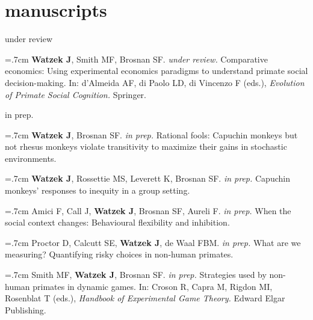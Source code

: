 \documentclass[]{friggeri-cv}
\begin{document}
\section{manuscripts}

{\large{} under review}

\hangindent=.7cm \textbf{Watzek J}, Smith MF, Brosnan SF. \emph{under review.} Comparative economics: Using experimental economics paradigms to understand primate social decision-making. In: d'Almeida AF, di Paolo LD, di Vincenzo F (eds.), \emph{Evolution of Primate Social Cognition.} Springer.


\newpage
\thispagestyle{fancy}

{\large{} in prep.}

\hangindent=.7cm \textbf{Watzek J}, Brosnan SF. \emph{in prep.} Rational fools: Capuchin monkeys but not rhesus monkeys violate transitivity to maximize their gains in stochastic environments.

\hangindent=.7cm \textbf{Watzek J}, Rossettie MS, Leverett K, Brosnan SF. \emph{in prep.} Capuchin monkeys' responses to inequity in a group setting.

\hangindent=.7cm Amici F, Call J, \textbf{Watzek J}, Brosnan SF, Aureli F. \emph{in prep.} When the social context changes: Behavioural flexibility and inhibition.



\hangindent=.7cm Proctor D, Calcutt SE, \textbf{Watzek J}, de Waal FBM. \emph{in prep.} What are we measuring? Quantifying risky choices in non-human primates.

\hangindent=.7cm Smith MF, \textbf{Watzek J}, Brosnan SF. \emph{in prep.} Strategies used by non-human primates in dynamic games. In: Croson R, Capra M, Rigdon MI, Rosenblat T (eds.), \emph{Handbook of Experimental Game Theory.} Edward Elgar Publishing. \\[-.1cm]
\end{document}
